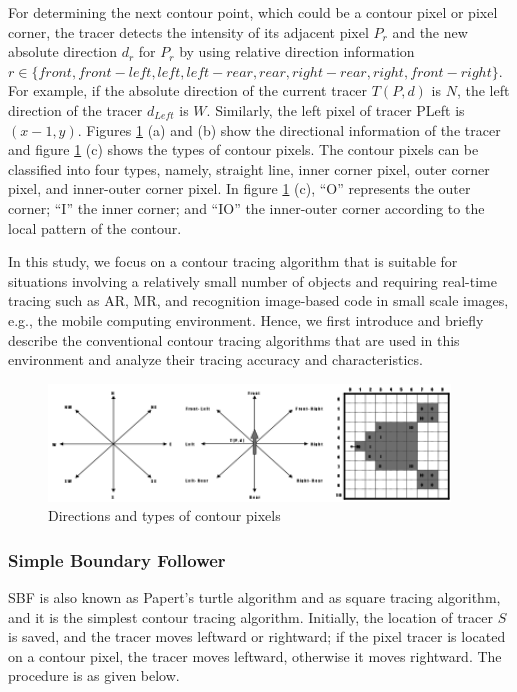 For determining the next contour point, which could be a contour pixel or pixel corner, the tracer detects the intensity of its adjacent pixel $P_r$ and the new absolute direction $d_r$ for $P_r$ by using relative direction information $r\in\{front, front-left, left, left-rear, rear, right-rear, right, front-right\}$. For example, if the absolute direction of the current tracer $T(P, d)$ is $N$, the left direction of the tracer $d_{Left}$ is $W$. Similarly, the left pixel of tracer PLeft is $(x-1, y)$. Figures \ref{fig:dir_types} (a) and (b) show the directional information of the tracer and figure \ref{fig:dir_types} (c) shows the types of contour pixels. The contour pixels can be classified into four types, namely, straight line, inner corner pixel, outer corner pixel, and inner-outer corner pixel. In figure \ref{fig:dir_types} (c), ``O'' represents the outer corner; ``I'' the inner corner; and ``IO'' the inner-outer corner according to the local pattern of the contour.

In this study, we focus on a contour tracing algorithm that is suitable for situations involving a relatively small number of objects and requiring real-time tracing such as AR, MR, and recognition image-based code in small scale images, e.g., the mobile computing environment. Hence, we first introduce and briefly describe the conventional contour tracing algorithms that are used in this environment and analyze their tracing accuracy and characteristics.  

\begin{figure}[htbp]
	\centering
	\includegraphics[width=0.95\textwidth]{2.RelatedWorks/directions_and_types.png}
	\caption{Directions and types of contour pixels}
	\label{fig:dir_types}
\end{figure}


\subsubsection{Simple Boundary Follower}

SBF is also known as Papert’s turtle algorithm \cite{Das1990Bivariate} and as square tracing algorithm\cite{Toussaint????Grids}, and it is the simplest contour tracing algorithm. Initially, the location of tracer $S$ is saved, and the tracer moves leftward or rightward; if the pixel tracer is located on a contour pixel, the tracer moves leftward, otherwise it moves rightward. The procedure is as given below.

